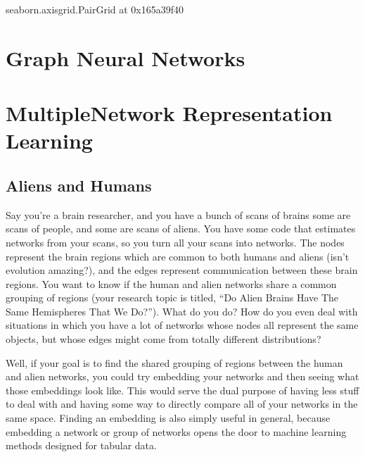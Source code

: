 \documentclass[letterpaper,10pt,english]{jupyterBook}
\begin{document}
\begin{sphinxVerbatim}[commandchars=\\\{\}]
\PYGZlt{}seaborn.axisgrid.PairGrid at 0x165a39f40\PYGZgt{}
\end{sphinxVerbatim}

\noindent{}


\section{Graph Neural Networks}
\label{\detokenize{representations/ch6/graph-neural-networks:graph-neural-networks}}\label{\detokenize{representations/ch6/graph-neural-networks::doc}}

\section{Multiple\sphinxhyphen{}Network Representation Learning}
\label{\detokenize{representations/ch6/multigraph-representation-learning:multiple-network-representation-learning}}\label{\detokenize{representations/ch6/multigraph-representation-learning::doc}}

\subsection{Aliens and Humans}
\label{\detokenize{representations/ch6/multigraph-representation-learning:aliens-and-humans}}
\sphinxAtStartPar
Say you’re a brain researcher, and you have a bunch of scans of brains \sphinxhyphen{} some are scans of people, and some are scans of aliens. You have some code that estimates networks from your scans, so you turn all your scans into networks. The nodes represent the brain regions which are common to both humans and aliens (isn’t evolution amazing?), and the edges represent communication between these brain regions. You want to know if the human and alien networks share a common grouping of regions (your research topic is titled, “Do Alien Brains Have The Same Hemispheres That We Do?”). What do you do? How do you even deal with situations in which you have a lot of networks whose nodes all represent the same objects, but whose edges might come from totally different distributions?

\sphinxAtStartPar
Well, if your goal is to find the shared grouping of regions between the human and alien networks, you could try embedding your networks and then seeing what those embeddings look like. This would serve the dual purpose of having less stuff to deal with and having some way to directly compare all of your networks in the same space. Finding an embedding is also simply useful in general, because embedding a network or group of networks opens the door to machine learning methods designed for tabular data.
\end{document}
